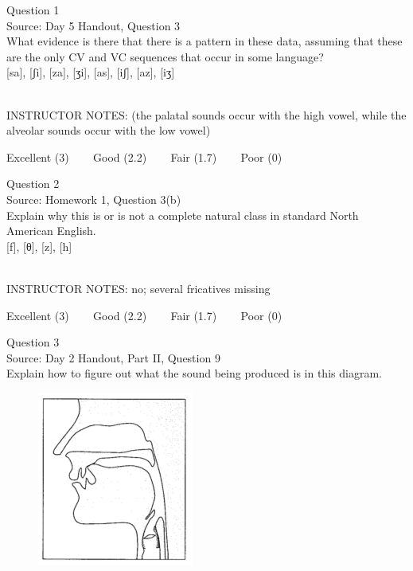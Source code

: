 \documentclass[12pt]{article}
\begin{document}
{\large Question 1}\\

Source: Day 5 Handout, Question 3\\

What evidence is there that there is a pattern in these data, assuming that these are the only CV and VC sequences that occur in some language?\\

{[sa]}, {[ʃi]}, {[za]}, {[ʒi]}, {[as]}, {[iʃ]}, {[az]}, {[iʒ]}


~\\
INSTRUCTOR NOTES: (the palatal sounds occur with the high vowel, while the alveolar sounds occur with the low vowel)


\vfill
Excellent (3) ~~~ Good (2.2) ~~~ Fair (1.7) ~~~ Poor (0)
\newpage

{\large Question 2}\\

Source: Homework 1, Question 3(b)\\

Explain why this is or is not a complete natural class in standard North American English.\\

{[f]}, {[θ]}, {[z]}, {[h]}


~\\
INSTRUCTOR NOTES: no; several fricatives missing


\vfill
Excellent (3) ~~~ Good (2.2) ~~~ Fair (1.7) ~~~ Poor (0)
\newpage

{\large Question 3}\\

Source: Day 2 Handout, Part II, Question 9\\

Explain how to figure out what the sound being produced is in this diagram.\\

\begin{figure}[H]
\includegraphics{../images/sagittal_t.png}
\end{figure}
\end{document}
